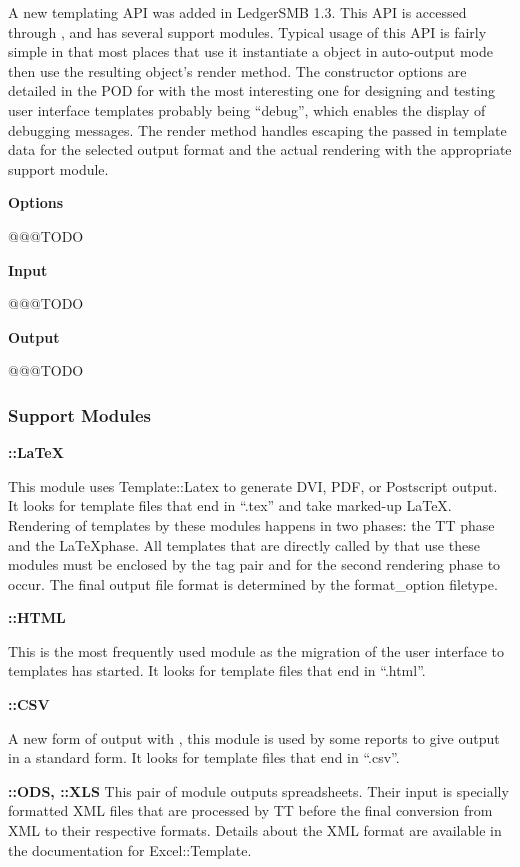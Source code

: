 A new templating API was added in LedgerSMB 1.3.  This API is accessed through
\lsmbt, and has several support modules.  Typical usage of this API is fairly
simple in that most places that use it instantiate a \lsmbt{ }object in
auto-output mode then use the resulting object's render method.  The
constructor options are detailed in the POD for \lsmbt{ }with the most
interesting one for designing and testing user interface templates probably
being ``debug'', which enables the display of debugging messages.  The render
method handles escaping the passed in template data for the selected output
format and the actual rendering with the appropriate support module.

\textbf{Options}

@@@TODO

\textbf{Input}

@@@TODO

\textbf{Output}

@@@TODO

\subsubsection{Support Modules}
\label{subsec-company-config-templates-modules}

\textbf{\lsmbt::LaTeX}

This module uses Template::Latex to generate DVI, PDF, or Postscript output.
It looks for template files that end in ``.tex'' and take marked-up \LaTeX.
Rendering of templates by these modules happens in two phases: the TT phase
and the \LaTeX phase.  All templates that are directly called by \lsmbt{ }that
use these modules must be enclosed by the tag pair  and
 for the second rendering phase to occur.  The final output file
format is determined by the format\_option filetype.

\textbf{\lsmbt::HTML}

This is the most frequently used \lsmbt{ }module as the migration of the user
interface to templates has started.  It looks for template files that end in
``.html''.

\textbf{\lsmbt::CSV}

A new form of output with , this module is used by some reports to
give output in a standard form.  It looks for template files that end in
``.csv''.

\textbf{\lsmbt::ODS, \lsmbt::XLS}
This pair of module outputs spreadsheets.  Their input is specially formatted
XML files that are processed by TT before the final conversion from XML to
their respective formats.  Details about the XML format are available in the
documentation for Excel::Template.

